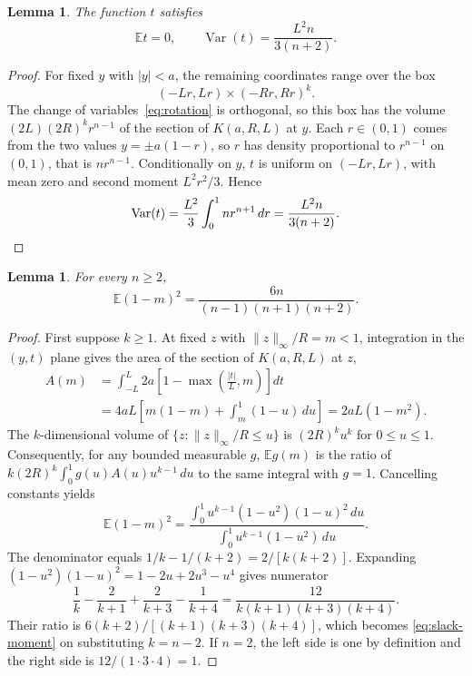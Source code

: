 \documentclass[11pt]{amsart}
\newtheorem{lemma}[theorem]{Lemma}
\theoremstyle{remark}
\numberwithin{equation}{section}
\newcommand{\E}{\mathbb E}
\newcommand{\Var}{\operatorname{Var}}
\begin{document}
\begin{lemma}\label{lem:long-variance}
The function $t$ satisfies
\begin{equation}\label{eq:variance}
 \E t=0,\qquad \Var(t)=\frac{L^2n}{3(n+2)}.
\end{equation}
\end{lemma}
\begin{proof}
For fixed $y$ with $|y|<a$, the remaining coordinates range over the box
\[
 (-Lr,Lr)\times(-Rr,Rr)^k.
\]
The change of variables~\eqref{eq:rotation} is orthogonal, so this box
has the volume $(2L)(2R)^k r^{n-1}$ of the section of $K(a,R,L)$ at $y$.
Each $r\in(0,1)$ comes from the two values $y=\pm a(1-r)$, so $r$ has
density proportional to $r^{n-1}$ on $(0,1)$, that is $nr^{n-1}$.
Conditionally on $y$, $t$ is uniform on $(-Lr,Lr)$, with mean zero
and second moment $L^2r^2/3$. Hence
\[
 \Var(t)=\frac{L^2}{3}\int_0^1 nr^{n+1}\,dr
 =\frac{L^2n}{3(n+2)}.\qedhere
\]
\end{proof}

\begin{lemma}\label{lem:slack-moment}
For every $n\ge2$,
\begin{equation}\label{eq:slack-moment}
 \E(1-m)^2=\frac{6n}{(n-1)(n+1)(n+2)}.
\end{equation}
\end{lemma}
\begin{proof}
First suppose $k\ge1$. At fixed $z$ with $\|z\|_\infty/R=m<1$,
integration in the $(y,t)$ plane gives the area of the section of $K(a,R,L)$ at $z$,
\begin{align*}
 A(m)&=\int_{-L}^L 2a\left[1-\max\left(\frac{|t|}{L},m\right)\right]dt\\
 &=4aL\left[m(1-m)+\int_m^1(1-u)\,du\right]
 =2aL(1-m^2).
\end{align*}
The $k$-dimensional volume of $\{z:\|z\|_\infty/R\le u\}$ is
$(2R)^k u^k$ for $0\le u\le1$.
Consequently, for any bounded measurable $g$,
$\E g(m)$ is the ratio of
$k(2R)^k\int_0^1 g(u)A(u)u^{k-1}\,du$ to the same integral with
$g=1$. Cancelling constants yields
\[
 \E(1-m)^2=
 \frac{\int_0^1 u^{k-1}(1-u^2)(1-u)^2\,du}
 {\int_0^1 u^{k-1}(1-u^2)\,du}.
\]
The denominator equals $1/k-1/(k+2)=2/[k(k+2)]$.
Expanding $(1-u^2)(1-u)^2=1-2u+2u^3-u^4$ gives numerator
\[
 \frac1k-\frac2{k+1}+\frac2{k+3}-\frac1{k+4}
 =\frac{12}{k(k+1)(k+3)(k+4)}.
\]
Their ratio is $6(k+2)/[(k+1)(k+3)(k+4)]$, which becomes
\eqref{eq:slack-moment} on substituting $k=n-2$.
If $n=2$, the left side is one by definition and the right side
is $12/(1\cdot3\cdot4)=1$.
\end{proof}
\end{document}
